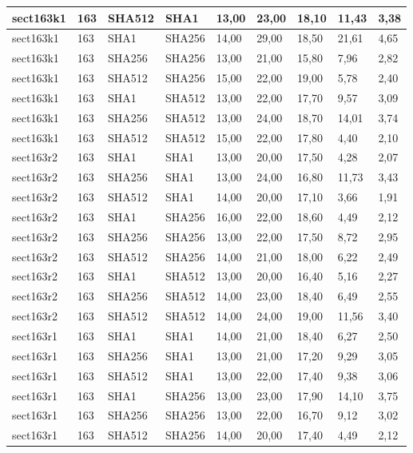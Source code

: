 \begin{longtable}{| l | l | l | l | l |l |l |l |l |}
sect163k1 & 163 & SHA512 & SHA1 & 13,00 & 23,00 & 18,10 & 11,43 & 3,38 \\ \hline 
sect163k1 & 163 & SHA1 & SHA256 & 14,00 & 29,00 & 18,50 & 21,61 & 4,65 \\ \hline 
sect163k1 & 163 & SHA256 & SHA256 & 13,00 & 21,00 & 15,80 & 7,96 & 2,82 \\ \hline 
sect163k1 & 163 & SHA512 & SHA256 & 15,00 & 22,00 & 19,00 & 5,78 & 2,40 \\ \hline 
sect163k1 & 163 & SHA1 & SHA512 & 13,00 & 22,00 & 17,70 & 9,57 & 3,09 \\ \hline 
sect163k1 & 163 & SHA256 & SHA512 & 13,00 & 24,00 & 18,70 & 14,01 & 3,74 \\ \hline 
sect163k1 & 163 & SHA512 & SHA512 & 15,00 & 22,00 & 17,80 & 4,40 & 2,10 \\ \hline 
sect163r2 & 163 & SHA1 & SHA1 & 13,00 & 20,00 & 17,50 & 4,28 & 2,07 \\ \hline 
sect163r2 & 163 & SHA256 & SHA1 & 13,00 & 24,00 & 16,80 & 11,73 & 3,43 \\ \hline 
sect163r2 & 163 & SHA512 & SHA1 & 14,00 & 20,00 & 17,10 & 3,66 & 1,91 \\ \hline 
sect163r2 & 163 & SHA1 & SHA256 & 16,00 & 22,00 & 18,60 & 4,49 & 2,12 \\ \hline 
sect163r2 & 163 & SHA256 & SHA256 & 13,00 & 22,00 & 17,50 & 8,72 & 2,95 \\ \hline 
sect163r2 & 163 & SHA512 & SHA256 & 14,00 & 21,00 & 18,00 & 6,22 & 2,49 \\ \hline 
sect163r2 & 163 & SHA1 & SHA512 & 13,00 & 20,00 & 16,40 & 5,16 & 2,27 \\ \hline 
sect163r2 & 163 & SHA256 & SHA512 & 14,00 & 23,00 & 18,40 & 6,49 & 2,55 \\ \hline 
sect163r2 & 163 & SHA512 & SHA512 & 14,00 & 24,00 & 19,00 & 11,56 & 3,40 \\ \hline 
sect163r1 & 163 & SHA1 & SHA1 & 14,00 & 21,00 & 18,40 & 6,27 & 2,50 \\ \hline 
sect163r1 & 163 & SHA256 & SHA1 & 13,00 & 21,00 & 17,20 & 9,29 & 3,05 \\ \hline 
sect163r1 & 163 & SHA512 & SHA1 & 13,00 & 22,00 & 17,40 & 9,38 & 3,06 \\ \hline 
sect163r1 & 163 & SHA1 & SHA256 & 13,00 & 23,00 & 17,90 & 14,10 & 3,75 \\ \hline 
sect163r1 & 163 & SHA256 & SHA256 & 13,00 & 22,00 & 16,70 & 9,12 & 3,02 \\ \hline 
sect163r1 & 163 & SHA512 & SHA256 & 14,00 & 20,00 & 17,40 & 4,49 & 2,12 \\ \hline 

\end{longtable}
